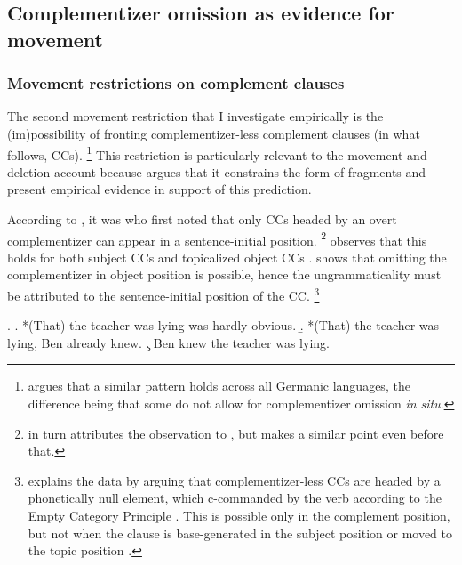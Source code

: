\subsection{Complementizer omission as evidence for movement}\label{sec:ccs-background}
\subsubsection{Movement restrictions on complement clauses}
\begin{sloppypar}
The second movement restriction that I investigate empirically is the (im)possibi\-lity of fronting complementizer-less complement clauses (in what follows, CCs).%
%
\footnote{\citet[83--85]{webelhuth1992} argues that a similar pattern holds across all Germanic languages, the difference being that some do not allow for complementizer omission \textit{in situ}.} %
%
This restriction is particularly relevant to the movement and deletion account because \citet{merchant2004} argues that it constrains the form of fragments and \citet{merchant.etal2013} present empirical evidence in support of this prediction.\end{sloppypar}

According to \citet{merchant2004}, it was \citet{stowell1981} who first noted that only CCs headed by an overt complementizer can appear in a sentence-initial position.%
%
\footnote{\citet{stowell1981} in turn attributes the observation to \citet{kayne1981}, but \citet[744]{morgan1973} makes a similar point even before that.}\afterfn%
%
\citet[396f]{stowell1981} observes that this holds for both subject CCs \Next[a] and topicalized object CCs \Next[b]. \Next[c] shows that omitting the complementizer in object position is possible, hence the ungrammaticality must be attributed to the sentence-initial position of the CC.%
%
\footnote{
\citet[396]{stowell1981} explains the data by arguing that complementizer-less CCs are headed by a phonetically null element, which c-commanded by the verb according to the Empty Category Principle \citep{chomsky1981}. This is possible only in the complement position, but not when the clause is base-generated in the subject position \Last[a] or moved to the topic position \Last[b].}\afterfn%
%

\ex. \a. *(That) the teacher was lying was hardly obvious.
      \b. *(That) the teacher was lying, Ben already knew.
 \c. Ben knew the teacher was lying.

